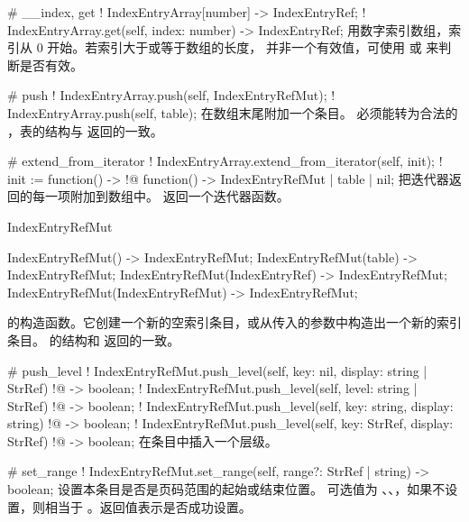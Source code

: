 \documentclass[class=article,doc={kv-usage}]{cusdoc}
\begin{document}
\begin{luadoc*}{}
# __index, get
! IndexEntryArray[number] -> IndexEntryRef;
! IndexEntryArray.get(self, index: number) -> IndexEntryRef;
用数字索引数组，索引从 0 开始。若索引大于或等于数组的长度， 并非一个有效值，可使用  或  来判断是否有效。
\end{luadoc*}

\begin{luadoc*}{}
# push
! IndexEntryArray.push(self, IndexEntryRefMut);
! IndexEntryArray.push(self, table);
在数组末尾附加一个条目。 必须能转为合法的 ，表的结构与  返回的一致。
\end{luadoc*}

\begin{luadoc*}{}
# extend_from_iterator
! IndexEntryArray.extend_from_iterator(self, init);
! init := function() ->
!@                function() -> IndexEntryRefMut | table | nil;
把迭代器返回的每一项附加到数组中。 返回一个迭代器函数。
\end{luadoc*}

\begin{luadoc}[global]{IndexEntryRefMut}
  \begin{luasyntax}
    IndexEntryRefMut()                 -> IndexEntryRefMut;
    IndexEntryRefMut(table)            -> IndexEntryRefMut;
    IndexEntryRefMut(IndexEntryRef)    -> IndexEntryRefMut;
    IndexEntryRefMut(IndexEntryRefMut) -> IndexEntryRefMut;
  \end{luasyntax}
 的构造函数。它创建一个新的空索引条目，或从传入的参数中构造出一个新的索引条目。 的结构和  返回的一致。
\end{luadoc}

\begin{luadoc*}{}
# push_level
! IndexEntryRefMut.push_level(self, key: nil, display: string | StrRef)
!@                           -> boolean;
! IndexEntryRefMut.push_level(self, level: string | StrRef)
!@                           -> boolean;
! IndexEntryRefMut.push_level(self, key: string, display: string)
!@                           -> boolean;
! IndexEntryRefMut.push_level(self, key: StrRef, display: StrRef)
!@                           -> boolean;
在条目中插入一个层级。
\end{luadoc*}

\begin{luadoc*}{}
# set_range
! IndexEntryRefMut.set_range(self, range?: StrRef | string) -> boolean;
设置本条目是否是页码范围的起始或结束位置。 可选值为 、、，如果不设置，则相当于 。返回值表示是否成功设置。
\end{luadoc*}
\end{document}
